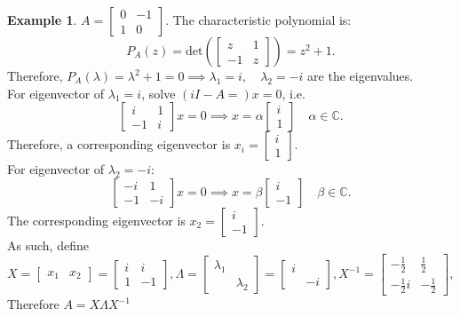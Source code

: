 \documentclass[12pt]{article}
\theoremstyle{definition}
\newtheorem{example}{Example}[section]
\theoremstyle{remark}
\newcommand{\C}{\mathbb{C}}
\begin{document}
\begin{example}
	$A=\begin{bmatrix} 0&-1\\1&0 \end{bmatrix} $. The characteristic polynomial is: \[
		P_A(z)=\text{det}\left( \begin{bmatrix} z&1\\-1&z \end{bmatrix}  \right) =z^2+1
	.\] Therefore, $P_A(\lambda)=\lambda^2+1=0 \implies \lambda_1=i,\quad \lambda_2=-i$ are the eigenvalues. \\For eigenvector of $\lambda_1=i$, solve $\left( i I-A= \right) x=0$, i.e. \[
		\begin{bmatrix} i&1\\-1&i \end{bmatrix} x=0\implies x=\alpha\begin{bmatrix} i\\1 \end{bmatrix} \quad \alpha\in \C
	.\] Therefore, a corresponding eigenvector is $x_{i}=\begin{bmatrix} i\\1 \end{bmatrix} $.\\For eigenvector of $\lambda_2=-i$: \[
		\begin{bmatrix} -i&1\\-1&-i \end{bmatrix} x=0\implies x=\beta\begin{bmatrix} i\\-1 \end{bmatrix} \quad\beta\in \C
	.\] The corresponding eigenvector is $x_2=\begin{bmatrix} i\\-1 \end{bmatrix} $.\\ As such, define $X=\begin{bmatrix} x_1&x_2 \end{bmatrix} =\begin{bmatrix} i&i\\1&-1 \end{bmatrix},\Lambda=\begin{bmatrix} \lambda_1&\\&\lambda_2 \end{bmatrix} =\begin{bmatrix} i&\\&-i \end{bmatrix},X^{-1}=\begin{bmatrix} -\frac{1}{2}&\frac{1}{2}\\-\frac{1}{2}i&-\frac{1}{2} \end{bmatrix} $,\\Therefore $A=X\Lambda X^{-1}$ \[
\]
\end{example}
\end{document}
